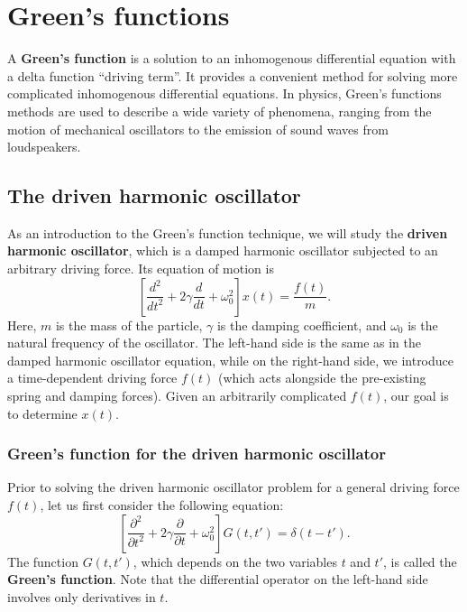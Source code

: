 \documentclass[10pt,a4paper]{article}
\begin{document}
\setcounter{page}{83}
    
\section{Green's functions}\label{greens-functions}

A \textbf{Green's function} is a solution to an inhomogenous
differential equation with a delta function ``driving term''. It
provides a convenient method for solving more complicated inhomogenous
differential equations. In physics, Green's functions methods are used
to describe a wide variety of phenomena, ranging from the motion of
mechanical oscillators to the emission of sound waves from
loudspeakers.

\subsection{The driven harmonic oscillator}
\label{the-driven-harmonic-oscillator}

As an introduction to the Green's function technique, we will study
the \textbf{driven harmonic oscillator}, which is a damped harmonic
oscillator subjected to an arbitrary driving force. Its equation of
motion is
\begin{equation}
\left[\frac{d^2}{dt^2} + 2 \gamma \frac{d}{dt} + \omega_0^2\right] x(t) = \frac{f(t)}{m}.
\end{equation}
Here, $m$ is the mass of the particle, $\gamma$ is the damping
coefficient, and $\omega_0$ is the natural frequency of the
oscillator. The left-hand side is the same as in the damped harmonic
oscillator equation, while on the right-hand side, we introduce a
time-dependent driving force $f(t)$ (which acts alongside the
pre-existing spring and damping forces). Given an arbitrarily
complicated $f(t)$, our goal is to determine $x(t)$.

\subsubsection{Green's function for the driven harmonic oscillator}
\label{greens-function-for-the-driven-harmonic-oscillator}

Prior to solving the driven harmonic oscillator problem for a general
driving force $f(t)$, let us first consider the following equation:
\begin{equation}
\left[\frac{\partial^2}{\partial t^2} + 2 \gamma \frac{\partial}{\partial t} + \omega_0^2\right] G(t, t') = \delta(t-t').
\end{equation}
The function $G(t,t')$, which depends on the two variables $t$ and
$t'$, is called the \textbf{Green's function}. Note that the
differential operator on the left-hand side involves only derivatives
in $t$.
\end{document}
